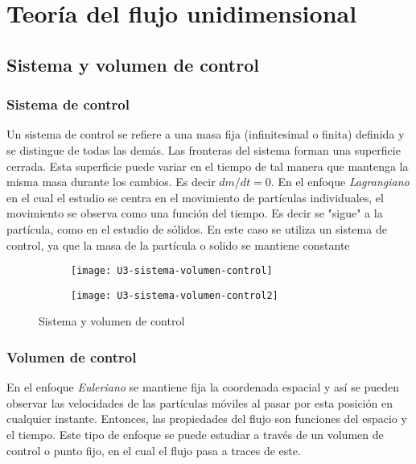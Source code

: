 \section{Teoría del flujo unidimensional}


\subsection{Sistema y volumen de control}

\subsubsection{Sistema de control}
Un sistema de control se refiere a una masa fija (infinitesimal o finita) definida y se distingue de todas las demás. Las fronteras del sistema forman una superficie cerrada. Esta superficie puede variar en el tiempo de tal manera que mantenga la misma masa durante los cambios. Es decir $dm/dt = 0$.
En el enfoque \emph{Lagrangiano} en el cual el estudio se centra en el movimiento de partículas individuales, el movimiento se observa como una función del tiempo. Es decir se "sigue" a la partícula, como en el estudio de sólidos. En este caso se utiliza un sistema de control, ya que la masa de la partícula o solido se mantiene constante

\begin{figure}[h]
	\centering
	\begin{subfigure}[b]{.45\linewidth}
		\centering
		\texttt{[image: U3-sistema-volumen-control]}
		\label{fig:manometro-u}
	\end{subfigure}
	\begin{subfigure}[b]{.45\linewidth}
		\centering
		\texttt{[image: U3-sistema-volumen-control2]}
		\label{fig:manometro-u2}
	\end{subfigure}
	\caption{Sistema y volumen de control}
\end{figure}

\subsubsection{Volumen de control}
En el enfoque \emph{Euleriano} se mantiene fija la coordenada espacial y así se pueden observar las velocidades de las partículas móviles al pasar por esta posición en cualquier instante. Entonces, las propiedades del flujo son funciones del espacio y el tiempo.
Este tipo de enfoque se puede estudiar a través de un volumen de control o punto fijo, en el cual el flujo pasa a traces de este.

